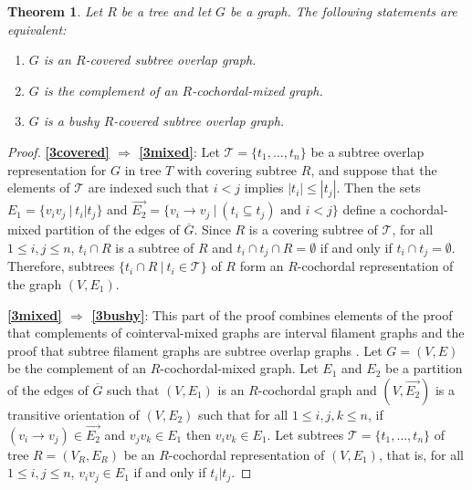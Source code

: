 \documentclass[
final
]{dmtcs-episciences}        \usepackage{graphics, amsthm, amsmath, amssymb, algorithm, algorithmic}
\newtheorem{theorem}{Theorem}
\begin{document}
\begin{theorem} \label{th:3parts}
Let $R$ be a tree and let $G$ be a graph. The following statements are equivalent:
\begin{enumerate}
\item $G$ is an $R$-covered subtree overlap graph. \label{3covered}
\item $G$ is the complement of an $R$-cochordal-mixed graph. \label{3mixed}
\item $G$ is a bushy $R$-covered subtree overlap graph. \label{3bushy}
\end{enumerate}
\end{theorem}
\begin{proof}

\textbf{\ref{3covered} $\Rightarrow$ \ref{3mixed}}: 
Let $\mathcal{T} = \{ t_1, \ldots, t_n \}$ be a subtree overlap representation for $G$ in tree $T$ with covering subtree $R$, and suppose that the elements of $\mathcal{T}$ are indexed such that $i<j$ implies $|t_i| \le |t_j|$.
Then the sets $E_1 = \{ v_i v_j ~|~ t_i | t_j \}$ and $\overrightarrow{E_2} = \{ v_i \rightarrow v_j ~|~ (t_i \subseteq t_j) \mbox{ and } i<j \}$
 define a cochordal-mixed partition of the edges of $\overline{G}$.
 Since $R$ is a covering subtree of $\mathcal{T}$, for all $1 \le i,j \le n$, $t_i \cap R$ is a subtree of $R$ and $t_i \cap t_j \cap R = \emptyset$ if and only if $t_i \cap t_j = \emptyset$.
Therefore, subtrees $\{ t_i \cap R ~|~ t_i \in \mathcal{T} \}$ of $R$ form an $R$-cochordal representation of the graph $(V, E_1)$.
 
\textbf{\ref{3mixed} $\Rightarrow$ \ref{3bushy}}: 
This part of the proof combines elements of the proof that complements of cointerval-mixed graphs are interval filament graphs \cite{gavril2000} and the proof that subtree filament graphs are subtree overlap graphs \cite{Jess}. 
Let $G=(V,E)$ be the complement of an $R$-cochordal-mixed graph.
Let $E_1$ and $E_2$ be a partition of the edges of $\overline{G}$ 
such that $(V, E_1)$ is an $R$-cochordal graph
and $ (V, \overrightarrow{E_2})$ is a transitive orientation of $(V, E_2)$ such that
for all $1 \le i,j,k \le n$, if
$(v_i \rightarrow v_j) \in \overrightarrow{E_2}$ and $v_j v_k \in E_1$ then $v_i v_k \in E_1$. 
Let subtrees $\mathcal{T} = \{ t_1, \ldots, t_n \}$ of tree $R = (V_R, E_R)$ be an $R$-cochordal representation of $(V, E_1)$, that is, for all $1 \le i,j \le n$, $v_i v_j \in E_1$ if and only if $t_i | t_j$.
      

\end{proof}
\end{document}
